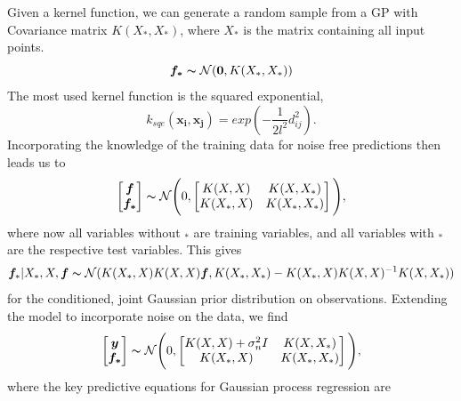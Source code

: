 Given a kernel function, we can generate a random sample from a GP with Covariance matrix $K(X_*, X_*)$, where $X_*$ is the matrix containing all input points. 
\begin{equation}%
	\bm{f_*} \thicksim \mathcal{N}(\bm{0}, K(X_*, X_*))
\label{Random Gaussian vector}
\end{equation}
The most used kernel function is the squared exponential,
\begin{equation}%
	k_{sqe}(\bm{x_i}, \bm{x_j}) = exp(-\frac{1}{2l^2}d_{ij}^2).
	\label{eq:squared-exponential}
\end{equation}
Incorporating the knowledge of the training data for noise free predictions then leads us to
\begin{equation}%
	\begin{bmatrix}	\bm{f} \\ \bm{f_*} \end{bmatrix} \thicksim \mathcal{N} \Bigg(0, \begin{bmatrix} K(X,X) & K(X,X_*) \\ K(X_*,X) & K(X_*,X_*) \end{bmatrix} \Bigg),
\label{eq:joint_distribution_according_to_prior}
\end{equation}
where now all variables without $_*$ are training variables, and all variables with $_*$ are the respective test variables. This gives 
\begin{equation}%
	\bm{f}_*|X_*,X,\bm{f} \thicksim \mathcal{N}(K(X_*,X)K(X,X)\bm{f}, K(X_*,X_*)-K(X_*,X)K(X,X)^{-1}K(X,X_*))
\label{conditioned/joint Gaussian prior}
\end{equation}
for the conditioned, joint Gaussian prior distribution on observations. Extending the model to incorporate noise on the data, we find
\begin{equation}%
	\begin{bmatrix}	\bm{y} \\ \bm{f_*} \end{bmatrix} 
	\thicksim \mathcal{N} \Bigg(0, 
	\begin{bmatrix} K(X,X)+\sigma_n^2 I & K(X,X_*) \\ K(X_*,X) & K(X_*,X_*) \end{bmatrix} \Bigg),
\label{eq:joint_gaussian_distribution_according_to_prior_with_noise}
\end{equation}
where the key predictive equations for Gaussian process regression are
